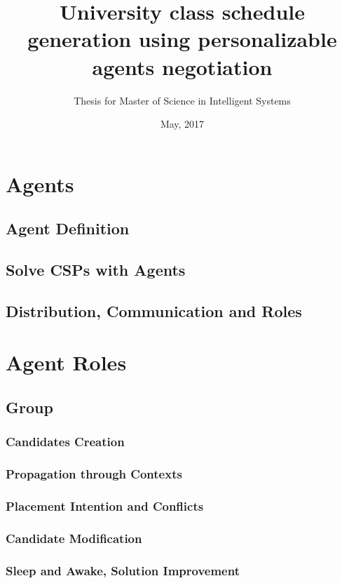 \documentclass{beamer}
\title{University class schedule generation using personalizable agents negotiation}
\subtitle{Thesis for Master of Science in Intelligent Systems}
\institute[ITESM]{Tecnol\'{o}gico de Monterrey}
\date{May, 2017}
\begin{document}
\frame{\titlepage}



\section{Agents}
\subsection{Agent Definition}
\subsection{Solve CSPs with Agents}
\subsection{Distribution, Communication and Roles}

\section{Agent Roles}

\subsection{Group}
\subsubsection{Candidates Creation}
\subsubsection{Propagation through Contexts}
\subsubsection{Placement Intention and Conflicts}
\subsubsection{Candidate Modification}
\subsubsection{Sleep and Awake, Solution Improvement}
\end{document}
